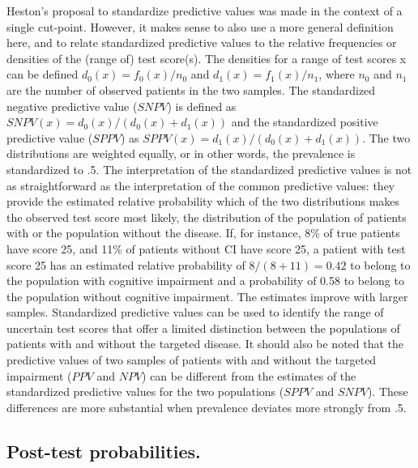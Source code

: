 \documentclass[
  nojss]{jss}
\begin{document}
Heston's proposal
\citetext{\citeyear{heston_standardizing_2011}; \citeyear{heston_standardized_2014}}
to standardize predictive values was made in the context of a single
cut-point. However, it makes sense to also use a more general definition
here, and to relate standardized predictive values to the relative
frequencies or densities of the (range of) test score(s). The densities
for a range of test scores x can be defined \(d_0(x) = f_0(x) / n_0\)
and \(d_1(x) = f_1(x) / n_1\), where \(n_0\) and \(n_1\) are the number
of observed patients in the two samples. The standardized negative
predictive value (\(SNPV\)) is defined as
\(SNPV(x) = d_0(x) / (d_0(x) + d_1(x))\) and the standardized positive
predictive value (\(SPPV\)) as \(SPPV(x) = d_1(x) / (d_0(x) + d_1(x))\).
The two distributions are weighted equally, or in other words, the
prevalence is standardized to .5. The interpretation of the standardized
predictive values is not as straightforward as the interpretation of the
common predictive values: they provide the estimated relative
probability which of the two distributions makes the observed test score
most likely, the distribution of the population of patients with or the
population without the disease. If, for instance, 8\% of true patients
have score 25, and 11\% of patients without CI have score 25, a patient
with test score 25 has an estimated relative probability of
\(8 / (8 + 11) = 0.42\) to belong to the population with cognitive
impairment and a probability of 0.58 to belong to the population without
cognitive impairment. The estimates improve with larger samples.
Standardized predictive values can be used to identify the range of
uncertain test scores that offer a limited distinction between the
populations of patients with and without the targeted disease. It should
also be noted that the predictive values of two samples of patients with
and without the targeted impairment (\(PPV\) and \(NPV\)) can be
different from the estimates of the standardized predictive values for
the two populations (\(SPPV\) and \(SNPV\)). These differences are more
substantial when prevalence deviates more strongly from .5.

\hypertarget{post-test-probabilities.}{%
\subsection{Post-test probabilities.}\label{post-test-probabilities.}}
\end{document}

